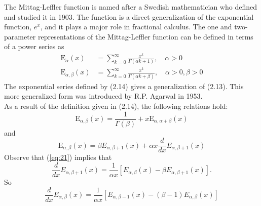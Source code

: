 \documentclass[a4paper,14pt,oneside]{book}
\theoremstyle{plain}
\theoremstyle{definition}
\theoremstyle{remark}
\begin{document}
\Large{
The Mittag-Leffler function is named after a Swedish mathematician who defined and studied it in 1903. The function is a direct generalization of the exponential function, $e^{x}$, and it plays a major role in fractional calculus. The one and two-parameter representations of the Mittag-Leffler function can be defined in terms of a power series as
\begin{align}
\mathrm{E}_{\alpha}(x)&=\sum_{k=0}^{\infty} \frac{x^{k}}{\Gamma(\alpha k+1)}, \quad \alpha>0\\
\mathrm{E}_{\alpha, \beta}(x)&=\sum_{k=0}^{\infty} \frac{x^{k}}{\Gamma(\alpha k+\beta)}, \quad \alpha>0, \beta>0
\end{align}
The exponential series defined by (2.14) gives a generalization of (2.13). This more generalized form was introduced by R.P. Agarwal in 1953.\\
As a result of the definition given in (2.14), the following relations hold:
\begin{equation}\label{eq:20}
\mathrm{E}_{\alpha, \beta}(x)=\frac{1}{\Gamma(\beta)}+x \mathrm{E}_{\alpha, \alpha+\beta}(x)
\end{equation}
and
\begin{equation}\label{eq:21}
\mathrm{E}_{\alpha, \beta}(x)=\beta E_{\alpha, \beta+1}(x)+\alpha x \frac{d}{d x} E_{\alpha, \beta+1}(x)
\end{equation}
Observe that (\ref{eq:21}) implies that
$$
\frac{d}{d x} E_{\alpha, \beta+1}(x)=\frac{1}{\alpha x}\left[E_{\alpha, \beta}(x)-\beta E_{\alpha, \beta+1}(x)\right] .
$$
So
\begin{equation}\label{eq:22}
\frac{d}{d x} E_{\alpha, \beta}(x)=\frac{1}{\alpha x}\left[E_{\alpha, \beta-1}(x)-(\beta-1) E_{\alpha, \beta}(x)\right]
\end{equation}

}
\end{document}
